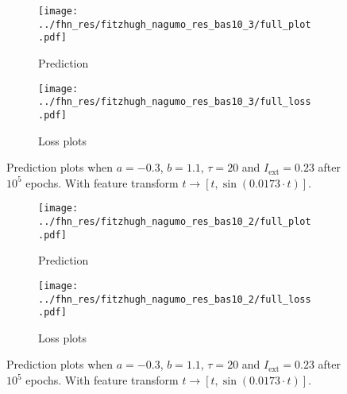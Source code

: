 \documentclass[a4paper]{article}
\begin{document}
\begin{figure}[H]
	\centering 
	\begin{subfigure}[b]{\textwidth}
		\centering
		\texttt{[image: ../fhn\_res/fitzhugh\_nagumo\_res\_bas10\_3/full\_plot.pdf]}
		\caption{Prediction}
		\label{fig:justb01a}
	\end{subfigure}
	\begin{subfigure}[b]{\textwidth}
		\centering
		\texttt{[image: ../fhn\_res/fitzhugh\_nagumo\_res\_bas10\_3/full\_loss.pdf]}
		\caption{Loss plots}
		\label{fig:justb01b}
	\end{subfigure}
	\caption{Prediction plots when $a=-0.3$, $b=1.1$, $\tau=20$ and $ I_{\text{ext}}=0.23$ after $10^5$ epochs. With feature transform $t \rightarrow \left[ t, \sin(0.0173\cdot t) \right] $.}%
	\label{plot:justb01}
\end{figure} 	



\begin{figure}[H]
	\centering 
	\begin{subfigure}[b]{\textwidth}
		\centering
		\texttt{[image: ../fhn\_res/fitzhugh\_nagumo\_res\_bas10\_2/full\_plot.pdf]}
		\caption{Prediction}
		\label{fig:justb07a}
	\end{subfigure}
	\begin{subfigure}[b]{\textwidth}
		\centering
		\texttt{[image: ../fhn\_res/fitzhugh\_nagumo\_res\_bas10\_2/full\_loss.pdf]}
		\caption{Loss plots}
		\label{fig:justb07b}
	\end{subfigure}
	\caption{Prediction plots when $a=-0.3$, $b=1.1$, $\tau=20$ and $ I_{\text{ext}}=0.23$ after $10^5$ epochs. With feature transform $t \rightarrow \left[ t, \sin(0.0173\cdot t) \right] $.}%
\label{plot:justb07}
\end{figure} 	
\end{document}
